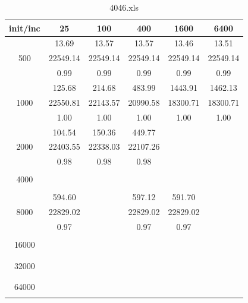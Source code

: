{\begin{table}[th]
\caption{4046.xls}
\label{tab:4046.xls}
\centering
\begin{tabular}{|c||c|c|c|c|c|}
\hline
init/inc & 25 & 100 & 400 & 1600 & 6400 \\ \hline \hline
  & 13.69 & 13.57 & 13.57 & 13.46 & 13.51\\ 
500  & 22549.14 & 22549.14 & 22549.14 & 22549.14 & 22549.14\\ 
  & 0.99 & 0.99 & 0.99 & 0.99 & 0.99\\ \hline 
  & 125.68 & 214.68 & 483.99 & 1443.91 & 1462.13\\ 
1000  & 22550.81 & 22143.57 & 20990.58 & 18300.71 & 18300.71\\ 
  & 1.00 & 1.00 & 1.00 & 1.00 & 1.00\\ \hline 
  & 104.54 & 150.36 & 449.77 &  & \\ 
2000  & 22403.55 & 22338.03 & 22107.26 &  & \\ 
  & 0.98 & 0.98 & 0.98 &  & \\ \hline 
  &  &  &  &  & \\ 
4000  &  &  &  &  & \\ 
  &  &  &  &  & \\ \hline 
  & 594.60 &  & 597.12 & 591.70 & \\ 
8000  & 22829.02 &  & 22829.02 & 22829.02 & \\ 
  & 0.97 &  & 0.97 & 0.97 & \\ \hline 
  &  &  &  &  & \\ 
16000  &  &  &  &  & \\ 
  &  &  &  &  & \\ \hline 
  &  &  &  &  & \\ 
32000  &  &  &  &  & \\ 
  &  &  &  &  & \\ \hline 
  &  &  &  &  & \\ 
64000  &  &  &  &  & \\ 
  &  &  &  &  & \\ \hline 
\end{tabular}
\end{table}

\cleardoublepage
}%
